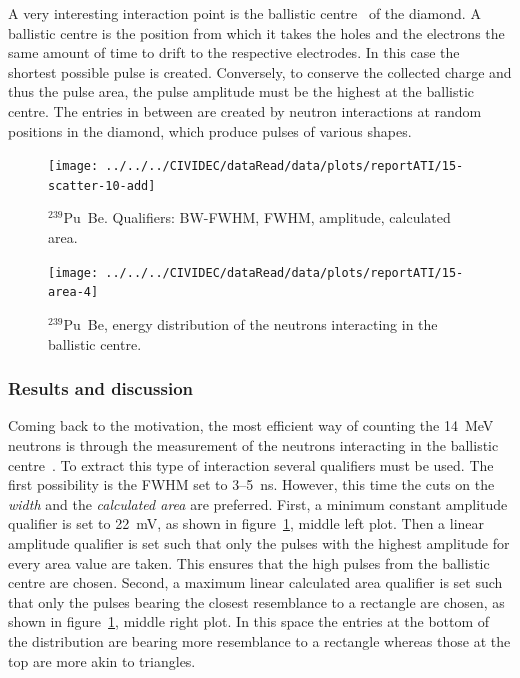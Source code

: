 A very interesting interaction point is the ballistic centre~\cite{PAVEL:00001, CHRISSI:00005} of the diamond. A ballistic centre is the position from which it takes the holes and the electrons the same amount of time to drift to the respective electrodes. In this case the shortest possible pulse is created. Conversely, to conserve the collected charge and thus the pulse area, the pulse amplitude must be the highest at the ballistic centre. The entries in between are created by neutron interactions at random positions in the diamond, which produce pulses of various shapes. 


\clearpage
\begin{figure}[]
\centering
\texttt{[image: ../../../CIVIDEC/dataRead/data/plots/reportATI/15-scatter-10-add]}
\caption{$^{239}$Pu~Be. Qualifiers: BW-FWHM, FWHM, amplitude, calculated area.}
\label{fig:scatterpu}
\end{figure}

\clearpage
\begin{figure}[!t]
\centering
\texttt{[image: ../../../CIVIDEC/dataRead/data/plots/reportATI/15-area-4]}
\caption{$^{239}$Pu~Be, energy distribution of the neutrons interacting in the ballistic centre.}
\label{fig:scatterpuarea}
\end{figure}

\subsubsection{Results and discussion}
Coming back to the motivation, the most efficient way of counting the 14~MeV neutrons is through the measurement of the neutrons interacting in the ballistic centre~\cite{PAVEL:00001, CHRISSI:00005}. To extract this type of interaction several qualifiers must be used. The first possibility is the FWHM set to 3--5~ns. However, this time the cuts on the \emph{width} and the \emph{calculated area} are preferred. First, a minimum constant amplitude qualifier is set to 22~mV, as shown in figure~\ref{fig:scatterpu}, middle left plot. Then a linear amplitude qualifier is set such that only the pulses with the highest amplitude for every area value are taken. This ensures that the high pulses from the ballistic centre are chosen. Second, a maximum linear calculated area qualifier is set such that only the pulses bearing the closest resemblance to a rectangle are chosen, as shown in figure~\ref{fig:scatterpu}, middle right plot. In this space the entries at the bottom of the distribution are bearing more resemblance to a rectangle whereas those at the top are more akin to triangles.

